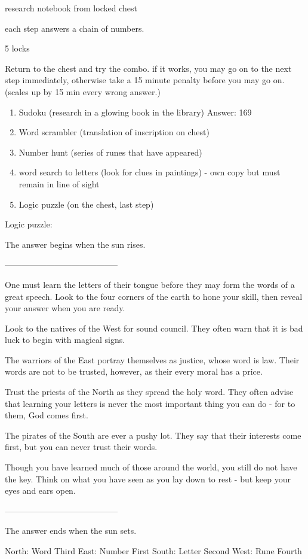 \documentclass[green]{NeptuneBall}
\begin{document}
\name{\gGlowShell{}}

research notebook from locked chest

each step answers a chain of numbers.

5 locks

Return to the chest and try the combo. if it works, you may go on to the next step immediately, otherwise take a 15 minute penalty before you may go on. (scales up by 15 min every wrong answer.)

\begin{enumerate}
\item Sudoku  (research in a glowing book in the library) Answer: 169
\item Word scrambler  (translation of inscription on chest)
\item Number hunt  (series of runes that have appeared) 
\item word search to letters  (look for clues in paintings) - own copy but must remain in line of sight
\item Logic puzzle  (on the chest, last step)
\end{enumerate}


Logic puzzle:

The answer begins when the sun rises. 

-----------------------------------------

One must learn the letters of their tongue before they may form the words of a great speech. Look to the four corners of the earth to hone your skill, then reveal your answer when you are ready.

Look to the natives of the West for sound council. They often warn that it is bad luck to begin with magical signs.

The warriors of the East portray themselves as justice, whose word is law. Their words are not to be trusted, however, as their every moral has a price.

Trust the priests of the North as they spread the holy word. They often advise that learning your letters is never the most important thing you can do - for to them, God comes first.

The pirates of the South are ever a pushy lot. They say that their interests come first, but you can never trust their words.

Though you have learned much of those around the world, you still do not have the key. Think on what you have seen as you lay down to rest - but keep your eyes and ears open.

-----------------------------------------

The answer ends when the sun sets.




North: Word Third
East: Number First
South: Letter Second
West: Rune Fourth
\end{document}
